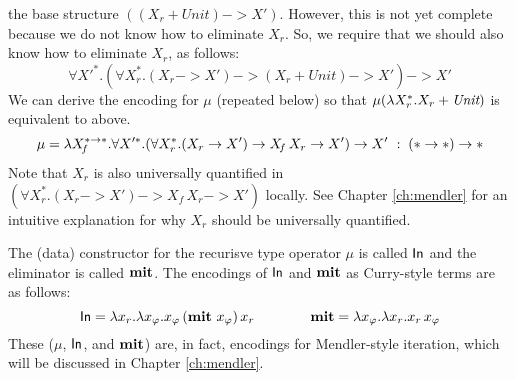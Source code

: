 the base structure $((X_r + \textit{Unit}) -> X')$.
However, this is not yet complete because we do not know how to eliminate $X_r$.
So, we require that we should also know how to eliminate $X_r$, as follows:
\[ \forall X'^{*}.
        (\forall X_r^{*}.(X_r -> X') -> (X_r + \textit{Unit}) -> X') -> X' \]
We can derive the encoding for $\mu$ (repeated below)
so that $\mu(\lambda X_r^{*}.X_r + \textit{Unit})$ is equivalent to above.
\[
\mu =
 \lambda X_{\!f}^{* -> *}.
 \forall X'^{*}.(\forall X_r^{*}.(X_r -> X') -> X_{\!f}\,X_r -> X') -> X'
 ~:\; (* -> *) -> *
\]
Note that $X_r$ is also universally quantified
in $(\forall X_r^{*}.(X_r -> X') -> X_{\!f}\,X_r -> X')$
locally.
See Chapter \ref{ch:mendler} %
for an intuitive explanation for why $X_r$ should be universally quantified.

The (data) constructor for the recurisve type operator $\mu$ is called $\mathsf{In}$
and the eliminator is called $\mathbf{mit}$. The encodings of $\mathsf{In}$ and $\mathbf{mit}$ as
Curry-style terms are as follows:
\[ \mathsf{In} = \lambda x_r. \lambda x_\varphi.x_\varphi\,(\mathbf{mit}~x_\varphi)\,x_r
\qquad\qquad \mathbf{mit} = \lambda x_\varphi.\lambda x_r.x_r\,x_\varphi \]
These ($\mu$, $\mathsf{In}$, and $\mathbf{mit}$) are, in fact, encodings for
Mendler-style iteration, which will be discussed in Chapter \ref{ch:mendler}.


